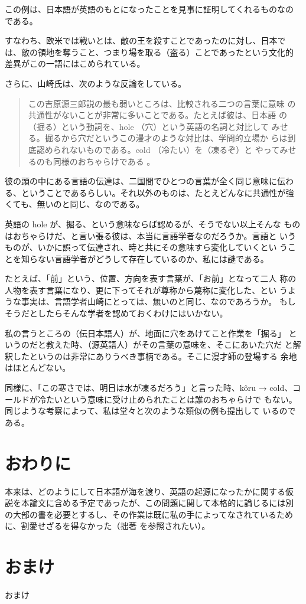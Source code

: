 ﻿\documentclass[11pt,twoside]{jreport}
\begin{document}
\noindent
この例は、日本語が英語のもとになったことを見事に証明してくれるものなの
である。

  すなわち、欧米では戦いとは、敵の王を殺すことであったのに対し、日本で
は、敵の領地を奪うこと、つまり場を取る（盗る）ことであったという文化的
差異がこの一語にはこめられている。

  さらに、山崎氏は、次のような反論をしている。

\begin{quote}
    この吉原源三郎説の最も弱いところは、比較される二つの言葉に意味
    の共通性がないことが非常に多いことである。たとえば彼は、日本語
    の（掘る）という動詞を、hole （穴）という英語の名詞と対比して
    みせる。掘るから穴だというこの漫才のような対比は、学問的立場か
    らは到底認められないものである。cold （冷たい）を（凍るぞ）と
    やってみせるのも同様のおちゃらけである \cite[96]{山崎91b}。
\end{quote}
\noindent
彼の頭の中にある言語の伝達は、二国間でひとつの言葉が全く同じ意味に伝わ
る、ということであるらしい。それ以外のものは、たとえどんなに共通性が強
くても、無いのと同じ、なのである。

  英語の hole が、掘る、という意味ならば認めるが、そうでない以上そんな
ものはおちゃらけだ、と言い張る彼は、本当に言語学者なのだろうか。言語と
いうものが、いかに誤って伝達され、時と共にその意味すら変化していくとい
うことを知らない言語学者がどうして存在しているのか、私には謎である。

  たとえば、「前」という、位置、方向を表す言葉が、「お前」となって二人
称の人物を表す言葉になり、更に下ってそれが尊称から蔑称に変化した、とい
うような事実は、言語学者山崎にとっては、無いのと同じ、なのであろうか。
もしそうだとしたらそんな学者を認めておくわけにはいかない。

  私の言うところの（伝日本語人）が、地面に穴をあけてこと作業を「掘る」
というのだと教えた時、（源英語人）がその言葉の意味を、そこにあいた穴だ
と解釈したというのは非常にありうべき事柄である。そこに漫才師の登場する
余地はほとんどない。

  同様に、「この寒さでは、明日は水が凍るだろう」と言った時、k\^oru → 
cold、コールドが冷たいという意味に受け止められたことは誰のおちゃらけで
もない。同じような考察によって、私は堂々と次のような類似の例も提出して
いるのである。


\chapter{おわりに}

本来は、どのようにして日本語が海を渡り、英語の起源になったかに関する仮
説を本論文に含める予定であったが、この問題に関して本格的に論じるには別
の大部の書を必要とするし、その作業は既に私の手によってなされているため
に、割愛せざるを得なかった（拙著 を参照されたい）。





\appendix
\chapter{おまけ}
おまけ
\end{document}
